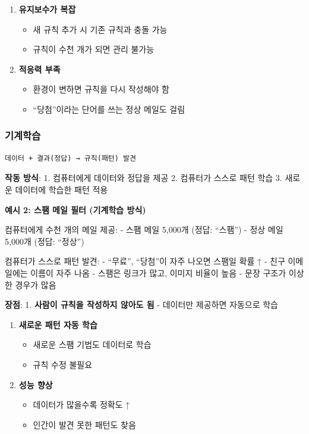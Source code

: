 \documentclass[a4paper, 11pt]{article}
\providecommand{\tightlist}{%
  \setlength{\itemsep}{0pt}\setlength{\parskip}{0pt}}
\begin{document}
\begin{enumerate}
\def\labelenumi{\arabic{enumi}.}
\setcounter{enumi}{1}
\tightlist
\item
  \textbf{유지보수가 복잡}

  \begin{itemize}
  \tightlist
  \item
    새 규칙 추가 시 기존 규칙과 충돌 가능
  \item
    규칙이 수천 개가 되면 관리 불가능
  \end{itemize}
\item
  \textbf{적응력 부족}

  \begin{itemize}
  \tightlist
  \item
    환경이 변하면 규칙을 다시 작성해야 함
  \item
    ``당첨''이라는 단어를 쓰는 정상 메일도 걸림
  \end{itemize}
\end{enumerate}

\hypertarget{uxae30uxacc4uxd559uxc2b5}{%
\subsubsection{기계학습}\label{uxae30uxacc4uxd559uxc2b5}}

\begin{verbatim}
데이터 + 결과(정답) → 규칙(패턴) 발견
\end{verbatim}

\textbf{작동 방식}: 1. 컴퓨터에게 데이터와 정답을 제공 2. 컴퓨터가
스스로 패턴 학습 3. 새로운 데이터에 학습한 패턴 적용

\textbf{예시 2: 스팸 메일 필터 (기계학습 방식)}

컴퓨터에게 수천 개의 메일 제공: - 스팸 메일 5,000개 (정답: ``스팸'') -
정상 메일 5,000개 (정답: ``정상'')

컴퓨터가 스스로 패턴 발견: - ``무료'', ``당첨''이 자주 나오면 스팸일
확률 ↑ - 친구 이메일에는 이름이 자주 나옴 - 스팸은 링크가 많고, 이미지
비율이 높음 - 문장 구조가 이상한 경우가 많음

\textbf{장점}: 1. \textbf{사람이 규칙을 작성하지 않아도 됨} - 데이터만
제공하면 자동으로 학습

\begin{enumerate}
\def\labelenumi{\arabic{enumi}.}
\setcounter{enumi}{1}
\tightlist
\item
  \textbf{새로운 패턴 자동 학습}

  \begin{itemize}
  \tightlist
  \item
    새로운 스팸 기법도 데이터로 학습
  \item
    규칙 수정 불필요
  \end{itemize}
\item
  \textbf{성능 향상}

  \begin{itemize}
  \tightlist
  \item
    데이터가 많을수록 정확도 ↑
  \item
    인간이 발견 못한 패턴도 찾음
  \end{itemize}
\end{enumerate}
\end{document}
